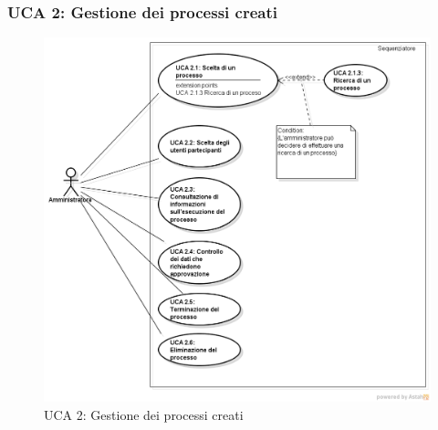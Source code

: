 \subsubsection{UCA 2: Gestione dei processi creati}
\begin{figure}[H]
\centering
\includegraphics[trim=0cm 0.8cm 0cm 0cm,clip=true,width=%
\textwidth]
{./grafici/A2}
\caption{UCA 2: Gestione dei processi creati}
\end{figure}
